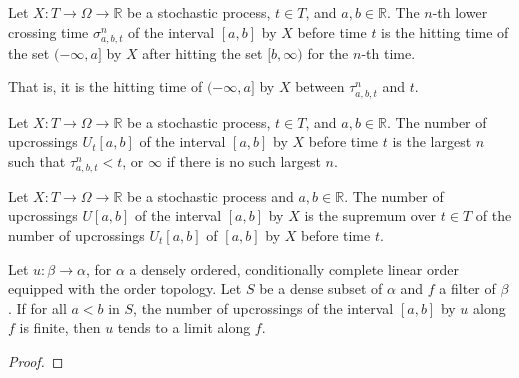 \begin{definition}\label{def:lowerCrossingTime}
  \mathlibok
Let $X : T \to \Omega \to \mathbb{R}$ be a stochastic process, $t \in T$, and $a, b \in \mathbb{R}$.
The $n$-th lower crossing time $\sigma^n_{a, b, t}$ of the interval $[a, b]$ by $X$ before time $t$ is the hitting time of the set $(-\infty, a]$ by $X$ after hitting the set $[b, \infty)$ for the $n$-th time.

That is, it is the hitting time of $(-\infty, a]$ by $X$ between $\tau^n_{a, b, t}$ and $t$.
\end{definition}


\begin{definition}\label{def:upcrossingsBefore}
  \mathlibok
Let $X : T \to \Omega \to \mathbb{R}$ be a stochastic process, $t \in T$, and $a, b \in \mathbb{R}$.
The number of upcrossings $U_t[a, b]$ of the interval $[a, b]$ by $X$ before time $t$ is the largest $n$ such that $\tau^n_{a, b, t} < t$, or $\infty$ if there is no such largest $n$.
\end{definition}


\begin{definition}[Upcrossings]\label{def:upcrossings}
  \mathlibok
Let $X : T \to \Omega \to \mathbb{R}$ be a stochastic process and $a, b \in \mathbb{R}$.
The number of upcrossings $U[a, b]$ of the interval $[a, b]$ by $X$ is the supremum over $t \in T$ of the number of upcrossings $U_t[a, b]$ of $[a, b]$ by $X$ before time $t$.
\end{definition}


\begin{lemma}\label{lem:tendsto_of_no_upcrossings}
  \mathlibok
Let $u : \beta \to \alpha$, for $\alpha$ a densely ordered, conditionally complete linear order equipped with the order topology.
Let $S$ be a dense subset of $\alpha$ and $f$ a filter of $\beta$.
If for all $a < b$ in $S$, the number of upcrossings of the interval $[a, b]$ by $u$ along $f$ is finite, then $u$ tends to a limit along $f$.
\end{lemma}

\begin{proof}\leanok

\end{proof}


